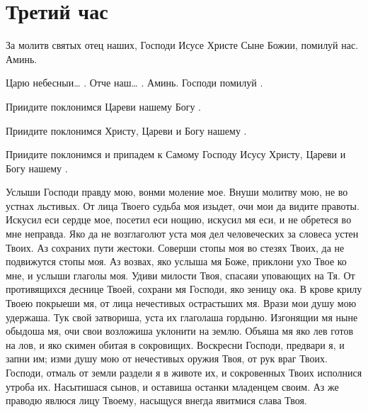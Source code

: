\section{Третий час}\begin{mymulticols}




За молитв святых отец наших, Господи Исусе Христе Сыне Божии, помилуй нас. Аминь.

Царю небесныи… .  Отче наш… . Аминь. Господи помилуй .  

Приидите поклонимся Цареви нашему Богу .

Приидите поклонимся Христу, Цареви и Богу нашему .

Приидите поклонимся и припадем к Самому Господу Исусу Христу, Цареви и Богу нашему .




Услыши Господи правду мою, вонми моление мое. Внуши молитву мою, не во устнах льстивых. От лица Твоего судьба моя изыдет, очи мои да видите правоты. Искусил еси сердце мое, посетил еси нощию, искусил мя еси, и не обретеся во мне неправда. Яко да не возглаголют уста моя дел человеческих за словеса устен Твоих. Аз сохраних пути жестоки. Соверши стопы моя во стезях Твоих, да не подвижутся стопы моя. Аз возвах, яко услыша мя Боже, приклони ухо Твое ко мне, и услыши глаголы моя. Удиви милости Твоя, спасаяи уповающих на Тя. От противящихся деснице Твоей, сохрани мя Господи, яко зеницу ока. В крове крилу Твоею покрыеши мя, от лица нечестивых острастьших мя. Врази мои душу мою удержаша. Тук свой затвориша, уста их глаголаша гордыню. Изгонящии мя ныне обыдоша мя, очи свои возложиша уклонити на землю. Объяша мя яко лев готов на лов, и яко скимен обитая в сокровищих. Воскресни Господи, предвари я, и запни им; изми душу мою от нечестивых оружия Твоя, от рук враг Твоих. Господи, отмаль от земли раздели я в животе их, и сокровенных Твоих исполнися утроба их. Насытишася сынов, и оставиша останки младенцем своим. Аз же праводю явлюся лицу Твоему, насыщуся внегда явитмися слава Твоя.





\end{mymulticols}
